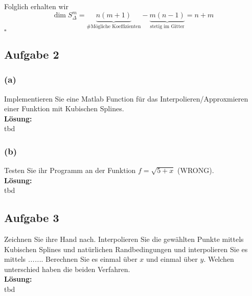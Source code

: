 \documentclass[11pt,a4paper,ngerman]{article}
\begin{document}
Folglich erhalten wir
\begin{equation*}
    \dim S_\Delta^m = \underbrace{n(m+1)}_\text{\#Mögliche Koeffizienten} - \underbrace{m(n-1)}_\text{stetig im Gitter} = n + m
\end{equation*}
\mbox{}\hfill$\square$

\subsection*{Aufgabe 2}

\subsubsection*{(a)}

Implementieren Sie eine Matlab Function für das Interpolieren/Approxmieren einer Funktion mit Kubischen Splines.\\

\textbf{Lösung:}\\

tbd

\subsubsection*{(b)}

Testen Sie ihr Programm an der Funktion $f = \sqrt{5 + x}$ (WRONG).\\

\textbf{Lösung:}\\

tbd

\subsection*{Aufgabe 3}

Zeichnen Sie ihre Hand nach. Interpolieren Sie die gewählten Punkte mittels Kubischen Splines und natürlichen Randbedingungen
und interpolieren Sie es mittels \emph{......}. Berechnen Sie es einmal über $x$ und einmal über $y$. Welchen unterschied
haben die beiden Verfahren.\\

\textbf{Lösung:}\\

tbd


\label{LastPage}
\end{document}
